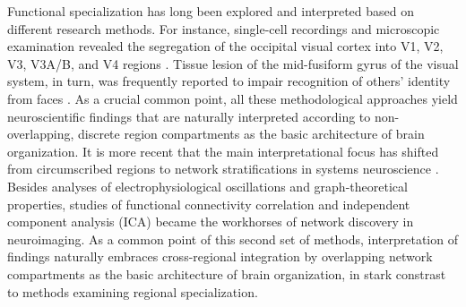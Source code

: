 \documentclass{article}
\begin{document}
Functional specialization has long been
explored and interpreted based on different research methods.
%
For instance,
single-cell recordings and microscopic examination
revealed the
segregation of the occipital visual cortex into V1, V2, V3, V3A/B, and V4
regions
\cite{hubel1962receptive, zeki1978functional}.
Tissue lesion of the mid-fusiform gyrus of the visual system,
in turn,
was frequently reported to impair
recognition of others' identity from faces
\cite{iaria2008contrib}.
%
As a crucial common point,
all these methodological approaches
yield neuroscientific findings
that are naturally interpreted according to
non-overlapping, discrete region compartments
as the basic architecture of brain organization.
It is more recent
that the main interpretational focus has shifted
from circumscribed regions to network stratifications
in systems neuroscience \cite{yuste2015}.
%
Besides analyses of
electrophysiological oscillations
and
graph-theoretical properties,
studies of
functional connectivity correlation \cite{buckner2013opportunities} and
independent component analysis (ICA) \cite{beckmann2005}
became the workhorses of network discovery
in neuroimaging.
%
As a common point of this second set of methods,
interpretation of findings naturally embraces
cross-regional integration by
overlapping network compartments
as the basic architecture of brain organization,
in stark constrast to methods examining regional specialization.
\end{document}
